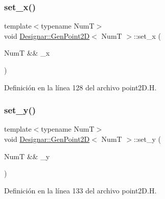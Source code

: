 \subsubsection{\texorpdfstring{set\+\_\+x()}{set\_x()}\hspace{0.1cm}{\footnotesize\ttfamily [2/2]}}
{\footnotesize\ttfamily template$<$typename NumT$>$ \\
void \hyperlink{class_designar_1_1_gen_point2_d}{Designar\+::\+Gen\+Point2D}$<$ NumT $>$\+::set\+\_\+x (\begin{DoxyParamCaption}\item[{NumT \&\&}]{\+\_\+x }\end{DoxyParamCaption})\hspace{0.3cm}{\ttfamily [inline]}}



Definición en la línea 128 del archivo point2\+D.\+H.

\mbox{\label{class_designar_1_1_gen_point2_d_af82a367767d79081e2afe1228fcf2bc6}} 
\subsubsection{\texorpdfstring{set\+\_\+y()}{set\_y()}}
{\footnotesize\ttfamily template$<$typename NumT$>$ \\
void \hyperlink{class_designar_1_1_gen_point2_d}{Designar\+::\+Gen\+Point2D}$<$ NumT $>$\+::set\+\_\+y (\begin{DoxyParamCaption}\item[{NumT \&\&}]{\+\_\+y }\end{DoxyParamCaption})\hspace{0.3cm}{\ttfamily [inline]}}



Definición en la línea 133 del archivo point2\+D.\+H.

\mbox{\label{class_designar_1_1_gen_point2_d_adda120357e8a76bd42b7cd9517cecaad}} 
